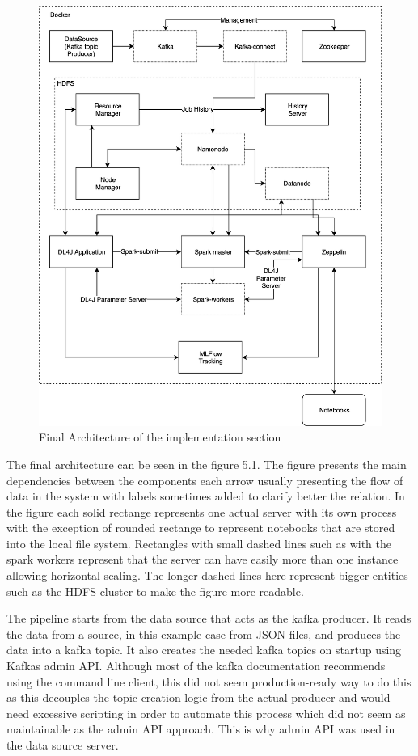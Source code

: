 \begin{figure}[ht!]
    \includegraphics[scale=0.20]{images/architecture} 
    \centering
    \caption{Final Architecture of the implementation section}
\end{figure}

The final architecture can be seen in the figure 5.1.
The figure presents the main dependencies between the components each arrow usually presenting the flow of data in the system with labels sometimes added to clarify better the relation.
In the figure each solid rectange represents one actual server with its own process with the exception of rounded rectange to represent notebooks that are stored into the local file system.
Rectangles with small dashed lines such as with the spark workers represent that the server can have easily more than one instance allowing horizontal scaling.
The longer dashed lines here represent bigger entities such as the HDFS cluster to make the figure more readable.

The pipeline starts from the data source that acts as the kafka producer.
It reads the data from a source, in this example case from JSON files, and produces the data into a kafka topic. 
It also creates the needed kafka topics on startup using Kafkas admin API.
Although most of the kafka documentation recommends using the command line client, this did not seem production-ready way to do this as this decouples the topic creation logic from the actual producer and would need excessive scripting in order to automate this process which did not seem as maintainable as the admin API approach.
This is why admin API was used in the data source server. 

